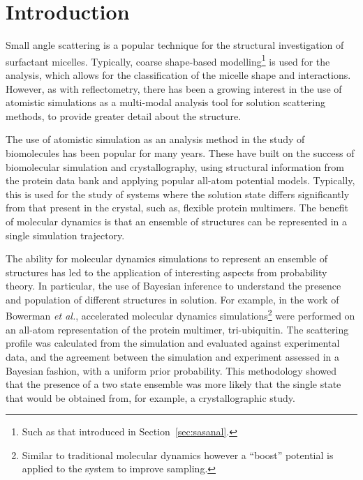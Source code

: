 \section{Introduction}

Small angle scattering is a popular technique for the structural investigation of surfactant micelles.\autocite{sanchez-fernandez_micellization_2016}
Typically, coarse shape-based modelling\footnote{Such as that introduced in Section~\ref{sec:sasanal}.} is used for the analysis, which allows for the classification of the micelle shape and interactions.
However, as with reflectometry, there has been a growing interest in the use of atomistic simulations as a multi-modal analysis tool for solution scattering methods,\autocite{ivanovic_temperature-dependent_2018} to provide greater detail about the structure.

The use of atomistic simulation as an analysis method in the study of biomolecules has been popular for many years.\autocite{perkins_solution_1991,mayans_demonstration_1995,hub_interpreting_2018}
These have built on the success of biomolecular simulation and crystallography, using structural information from the protein data bank\autocite{noauthor_rcsb_nodate} and applying popular all-atom potential models.
Typically, this is used for the study of systems where the solution state differs significantly from that present in the crystal, such as, flexible protein multimers.
The benefit of molecular dynamics is that an ensemble of structures can be represented in a single simulation trajectory.\autocite{chen_validating_2014,bowerman_determining_2017}

The ability for molecular dynamics simulations to represent an ensemble of structures has led to the application of interesting aspects from probability theory.
In particular, the use of Bayesian inference to understand the presence and population of different structures in solution.
For example, in the work of Bowerman \emph{et al.},\autocite{bowerman_determining_2017} accelerated molecular dynamics simulations\footnote{Similar to traditional molecular dynamics however a ``boost'' potential is applied to the system to improve sampling.} were performed on an all-atom representation of the protein multimer, tri-ubiquitin.
The scattering profile was calculated from the simulation and evaluated against experimental data, and the agreement between the simulation and experiment assessed in a Bayesian fashion, with a uniform prior probability.
This methodology showed that the presence of a two state ensemble was more likely that the single state that would be obtained from, for example, a crystallographic study.

